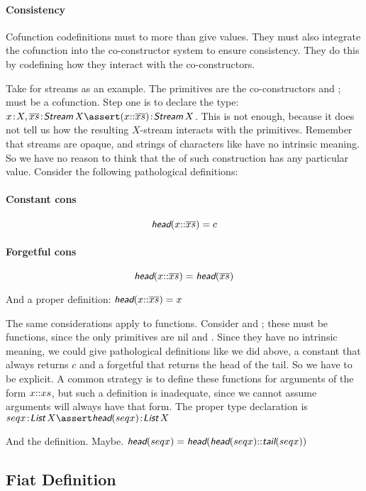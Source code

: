 \documentclass{article}
\begin{document}
\paragraph{Consistency}

Cofunction codefinitions must to more than give values. They must also
integrate the cofunction into the co-constructor system to ensure
consistency. They do this by codefining how they interact with the
co-constructors.

Take \Cons{} for streams as an example. The primitives are the
co-constructors \head{} and \tail{}; \cons{} must be a cofunction.
Step one is to declare the type: \(\tj{x}{X},
\tj{\coseq{x}}{\Stream\,X}\lso \tj{(x\cons\coseq{x})}{\Stream\,X}\).
This is not enough, because it does not tell us how the resulting
\(X\)-stream interacts with the primitives. Remember that streams are
opaque, and strings of characters like \cons have no intrinsic
meaning. So we have no reason to think that the \head of such
construction has any particular value. Consider the following
pathological definitions:

\paragraph{Constant cons}
\[\head(x\cons\coseq{x}) = c\]

\paragraph{Forgetful cons}
\[\head(x\cons\coseq{x}) = \head(\coseq{x})\]

And a proper definition: \(\head(x\cons\coseq{x}) = x\)

The same considerations apply to functions. Consider \head{} and
\tail{}; these must be functions, since the only primitives are nil
and \Cons. Since they have no intrinsic meaning, we could give
pathological definitions like we did above, a constant \head{} that
always returns \(c\) and a forgetful \head{} that returns the head of
the tail. So we have to be explicit. A common strategy is to define
these functions for arguments of the form \(x{\mathpunct{::}} xs\), but such a
definition is inadequate, since we cannot assume arguments will always
have that form. The proper type declaration is
\(\tj{seq{x}}{\List\,X} \linfer \tj{\head(seq{x})}{\List\,X}\)

And the definition. Maybe.
\(\head(seq{x}) = \head(\head(seq{x})\cons\tail(seq{x}))\)

\subsection{Fiat Definition}
\end{document}
